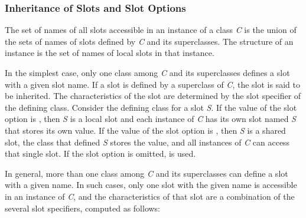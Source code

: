 \subsubsection{Inheritance of Slots and Slot Options}
\label{Inheritance-of-Slots-and-Slot-Options-SECTION}

The set of names of all slots accessible in an instance of a class
\emph{C} is the union of the sets of names of slots defined by \emph{C} and its
superclasses. The {\bit structure} of an instance is the set of names
of local slots in that instance.

In the simplest case, only one class among \emph{C} and its superclasses
defines a slot with a given slot name.  If a slot is defined by a
superclass of \emph{C}, the slot is said to be {\bit
inherited}.  The characteristics of the slot are determined by the
slot specifier of the defining class.  Consider the defining class for
a slot \emph{S}.  If the value of the  slot
option is , then \emph{S} is a local slot and each instance
of \emph{C} has its own slot named \emph{S} that stores its own value.  If the
value of the  slot option is , then \emph{S}
is a shared slot, the class that defined \emph{S} stores the value, and all
instances of \emph{C} can access that single slot.  If the 
 slot option is omitted,  is used.

In general, more than one class among \emph{C} and its superclasses can
define a slot with a given name.  In such cases, only one slot with
the given name is accessible in an instance of \emph{C}, and
the characteristics of that slot are a combination of the several slot
specifiers, computed as follows:

